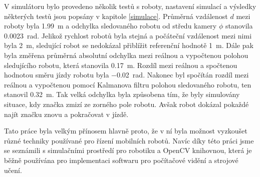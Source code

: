 \documentclass[twoside]{ctuthesis}
\theoremstyle{plain}
\theoremstyle{definition}
\theoremstyle{note}
\begin{document}
V simulátoru bylo provedeno několik testů s roboty, nastavení simulací a výsledky některých testů jsou popsány v kapitole \ref{simulace}. Průměrná vzdálenost $d$ mezi roboty byla \SI{1.99}{\meter} a odchylka sledovaného robotu od středu kamery $\phi$ stanovila \SI{0.0023}{\radian}. Jelikož rychlost robotů byla stejná a počáteční vzdálenost mezi nimi byla \SI{2}{\meter}, sledující robot se nedokázal přiblížit referenční hodnotě \SI{1}{\meter}. Dále pak byla změřena průměrná absolutní odchylka mezi reálnou a vypočtenou polohou sledujícího robotu, která stanovila \SI{0.17}{\meter}. Rozdíl mezi reálnou a spočtenou hodnotou směru jízdy robotu byla \SI{-0.02}{\radian}. Nakonec byl spočítán rozdíl mezi reálnou a vypočtenou pomocí Kalmanova filtru polohou sledovaného robotu, ten stanovil \SI{0.32}{\meter}. Tak velká odchylka byla způsobena tím, že byly simulovány situace, kdy značka zmizí ze zorného pole robotu. Avšak robot dokázal pokaždé najít značku znovu a pokračovat v jízdě. 


Tato práce byla velkým přínosem hlavně proto, že v ní byla možnost vyzkoušet různé techniky používané pro řízení mobilních robotů. Navíc díky této práci jsme se seznámili s simulačními prostředí pro robotiku a OpenCV knihovnou, která je běžně používána pro implementaci softwaru pro počítačové vidění a strojové učení.


\appendix
\end{document}
